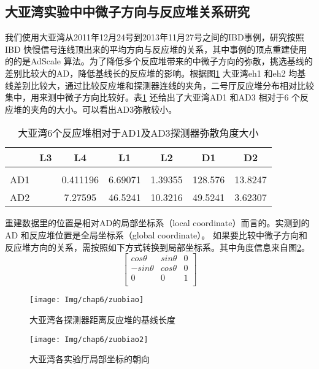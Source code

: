 \subsection{大亚湾实验中中微子方向与反应堆关系研究}
我们使用大亚湾从2011年12月24号到2013年11月27号之间的IBD事例，研究按照IBD 快慢信号连线顶出来的平均方向与反应堆的关系，其中事例的顶点重建使用的的是AdScale 算法。为了降低多个反应堆带来的中微子方向的弥散，挑选基线的差别比较大的AD，降低基线长的反应堆的影响。根据图\ref{fig:baseline} 大亚湾eh1 和eh2 均基线差别比较大，通过比较反应堆和探测器连线的夹角，二号厅反应堆分布相对比较集中，用来测中微子方向比较好。表\ref{tab:tcompangu} 还给出了大亚湾AD1 和AD3 相对于6 个反应堆的夹角的大小。可以看出AD3弥散较小。%
\begin{table}[htbp]
\centering  %
\begin{tabular}{lcccccc}  %
\hline
&L3 &L4 & L1&L2  &D1 &D2   \\ \hline  %
\\AD1&  &  0.411196 & 6.69071 &  1.39355  & 128.576 & 13.8247    %
\\ AD2  &  & 7.27595   & 46.5241 & 10.3216   &49.5241  & 3.62307 %
\\ \hline
\end{tabular}
\caption{大亚湾6个反应堆相对于AD1及AD3探测器弥散角度大小}
\label{tab:tcompangu}
\end{table}
重建数据里的位置是相对AD的局部坐标系（local coordinate）而言的。实测到的AD 和反应堆位置是全局坐标系（global coordinate）。 如果要比较中微子方向和反应堆方向的关系，需按照如下方式转换到局部坐标系。其中角度信息来自图\ref{fig:ehangu}。
\begin{equation}
\left[
  \begin{array}{ccc}   %
    cos\theta & sin\theta & 0\\  %
    -sin\theta & cos\theta & 0\\  %
    0&0&1\\
  \end{array}
\right]                %
\end{equation}
\begin{figure}[!htbp]
  \centering
   \texttt{[image: Img/chap6/zuobiao]}
    \caption{大亚湾各探测器距离反应堆的基线长度}
  \label{fig:baseline}
\end{figure}
\begin{figure}[!htbp]
  \centering
   \texttt{[image: Img/chap6/zuobiao2]}
    \caption{大亚湾各实验厅局部坐标的朝向}
  \label{fig:ehangu}
\end{figure}


